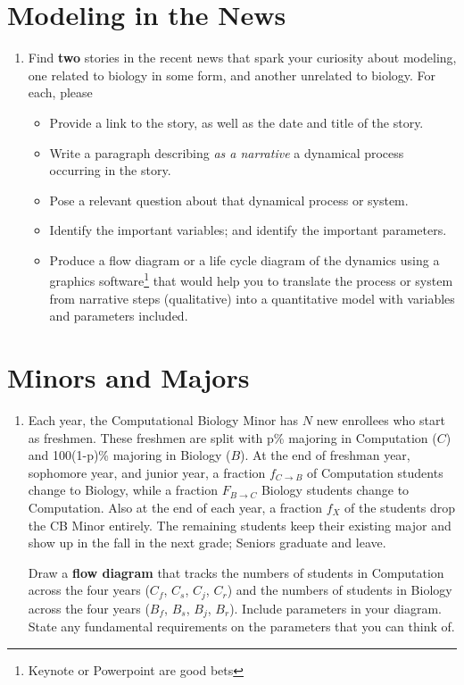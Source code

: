 \documentclass[11pt,onecolumn,superscriptaddress,notitlepage]{article}
\begin{document}
\section*{Modeling in the News}
\begin{enumerate}[resume]
\item Find {\bf two} stories in the recent news that spark your curiosity about modeling, one related to biology in some form, and another unrelated to biology. For each, please
\begin{itemize}
	\item Provide a link to the story, as well as the date and title of the story. 
	\item Write a paragraph describing {\it as a narrative} a dynamical process occurring in the story. 
	\item Pose a relevant question about that dynamical process or system.
	\item Identify the important variables; and identify the important parameters.
	\item Produce a flow diagram or a life cycle diagram of the dynamics using a graphics software\footnote{Keynote or Powerpoint are good bets} that would help you to translate the process or system from narrative steps (qualitative) into a quantitative model with variables and parameters included.
\end{itemize}
\end{enumerate}

\vspace{0.3in}
\section*{Minors and Majors}
\begin{enumerate}[resume]
\item Each year, the Computational Biology Minor has $N$ new enrollees who start as freshmen. These freshmen are split with p\% majoring in Computation ($C$) and 100(1-p)\% majoring in Biology ($B$). At the end of freshman year, sophomore year, and junior year, a fraction $f_{C\to B}$ of Computation students change to Biology, while a fraction $F_{B\to C}$ Biology students change to Computation. Also at the end of each year, a fraction $f_X$ of the students drop the CB Minor entirely. The remaining students keep their existing major and show up in the fall in the next grade; Seniors graduate and leave.

Draw a {\bf flow diagram} that tracks the numbers of students in Computation across the four years ($C_f$, $C_s$, $C_j$, $C_r$) and the numbers of students in Biology across the four years ($B_f$, $B_s$, $B_j$, $B_r$). Include parameters in your diagram. State any fundamental requirements on the parameters that you can think of. 
\end{enumerate}
\end{document}
